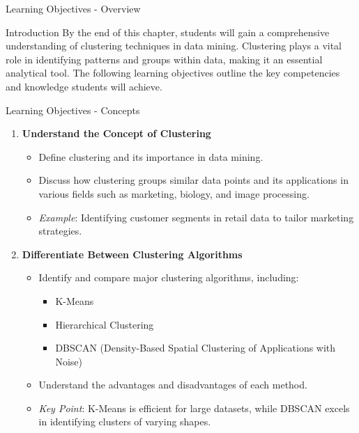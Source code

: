 \documentclass[aspectratio=169]{beamer}
\begin{document}
\begin{frame}[fragile]{Learning Objectives - Overview}
  \begin{block}{Introduction}
    By the end of this chapter, students will gain a comprehensive understanding of clustering techniques in data mining. Clustering plays a vital role in identifying patterns and groups within data, making it an essential analytical tool. The following learning objectives outline the key competencies and knowledge students will achieve.
  \end{block}
\end{frame}

\begin{frame}[fragile]{Learning Objectives - Concepts}
  \begin{enumerate}
    \item \textbf{Understand the Concept of Clustering}
      \begin{itemize}
        \item Define clustering and its importance in data mining.
        \item Discuss how clustering groups similar data points and its applications in various fields such as marketing, biology, and image processing.
        \item \emph{Example}: Identifying customer segments in retail data to tailor marketing strategies.
      \end{itemize}

    \item \textbf{Differentiate Between Clustering Algorithms}
      \begin{itemize}
        \item Identify and compare major clustering algorithms, including:
          \begin{itemize}
            \item K-Means
            \item Hierarchical Clustering
            \item DBSCAN (Density-Based Spatial Clustering of Applications with Noise)
          \end{itemize}
        \item Understand the advantages and disadvantages of each method.
        \item \emph{Key Point}: K-Means is efficient for large datasets, while DBSCAN excels in identifying clusters of varying shapes.
      \end{itemize}
  \end{enumerate}
\end{frame}
\end{document}
